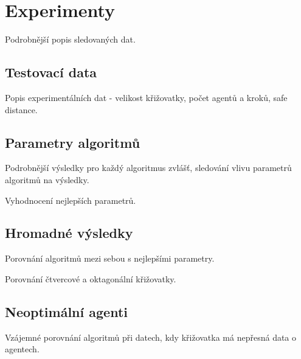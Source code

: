 \chapter{Experimenty}\label{ch:experimenty}

Podrobnější popis sledovaných dat.

\section{Testovací data}\label{sec:testovaci_data}

Popis experimentálních dat - velikost křižovatky, počet agentů a kroků, safe distance.

\section{Parametry algoritmů}\label{sec:parametry_algoritmu}

Podrobnější výsledky pro každý algoritmus zvlášť, sledování vlivu parametrů algoritmů na výsledky.

Vyhodnocení nejlepších parametrů.

\section{Hromadné výsledky}\label{sec:hromadne_vysledky}

Porovnání algoritmů mezi sebou s nejlepšími parametry.

Porovnání čtvercové a oktagonální křižovatky.

\section{Neoptimální agenti}\label{sec:neoptimalni_agenti}

Vzájemné porovnání algoritmů při datech, kdy křižovatka má nepřesná data o agentech.
